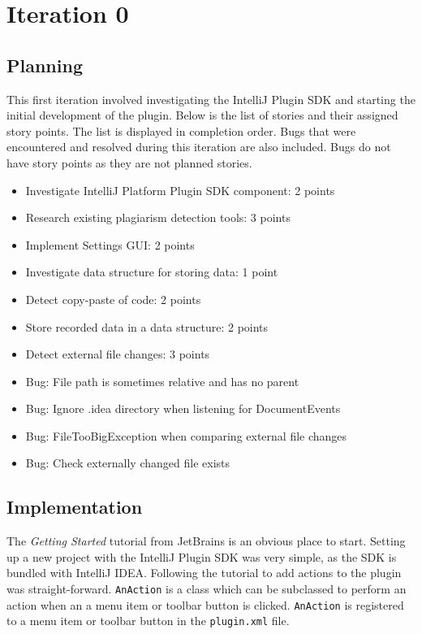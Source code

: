 \chapter{Iteration 0}
\section{Planning}
This first iteration involved investigating the IntelliJ Plugin SDK and starting the initial development of the plugin. Below is the list of stories and their assigned story points. The list is displayed in completion order. Bugs that were encountered and resolved during this iteration are also included. Bugs do not have story points as they are not planned stories.

\begin{itemize}
\item Investigate IntelliJ Platform Plugin SDK component: 2 points
\item Research existing plagiarism detection tools: 3 points
\item Implement Settings GUI: 2 points
\item Investigate data structure for storing data: 1 point
\item Detect copy-paste of code: 2 points
\item Store recorded data in a data structure: 2 points
\item Detect external file changes: 3 points
\item Bug: File path is sometimes relative and has no parent
\item Bug: Ignore .idea directory when listening for DocumentEvents
\item Bug: FileTooBigException when comparing external file changes
\item Bug: Check externally changed file exists
\end{itemize}

\section{Implementation}
The \textit{Getting Started} tutorial from JetBrains is an obvious place to start\cite{IntelliJGettingStarted}. Setting up a new project with the IntelliJ Plugin SDK was very simple, as the SDK is bundled with IntelliJ IDEA. Following the tutorial to add actions to the plugin was straight-forward. \texttt{AnAction} is a class which can be subclassed to perform an action when an a menu item or toolbar button is clicked. \texttt{AnAction} is registered to a menu item or toolbar button in the \texttt{plugin.xml} file.

